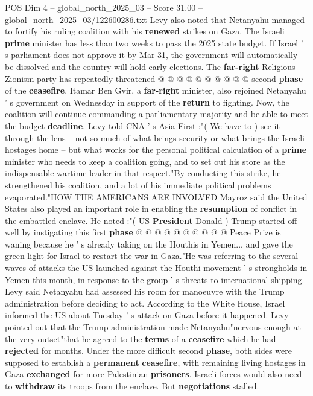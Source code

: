 \begin{textsample}{POS Dim 4 – global\_north\_2025\_03 – Score 31.00 – global\_north\_2025\_03/122600286.txt}
Levy also noted that Netanyahu managed to fortify his ruling coalition with his \textbf{renewed} strikes on Gaza.
The Israeli \textbf{prime} minister has less than two weeks to pass the 2025 state budget.
If Israel ' s parliament does not approve it by Mar 31, the government will automatically be dissolved and the country will hold early elections.
The \textbf{far-right} Religious Zionism party has repeatedly threatened @ @ @ @ @ @ @ @ @ @ second \textbf{phase} of the \textbf{ceasefire}.
Itamar Ben Gvir, a \textbf{far-right} minister, also rejoined Netanyahu ' s government on Wednesday in support of the \textbf{return} to fighting.
Now, the coalition will continue commanding a parliamentary majority and be able to meet the budget \textbf{deadline}.
Levy told CNA ' s Asia First :"( We have to ) see it through the lens -- not so much of what brings security or what brings the Israeli hostages home -- but what works for the personal political calculation of a \textbf{prime} minister who needs to keep a coalition going, and to set out his store as the indispensable wartime leader in that respect."By conducting this strike, he strengthened his coalition, and a lot of his immediate political problems evaporated."HOW THE AMERICANS ARE INVOLVED Mayroz said the United States also played an important role in enabling the \textbf{resumption} of conflict in the embattled enclave.
He noted :"( US \textbf{President} Donald ) Trump started off well by instigating this first \textbf{phase} @ @ @ @ @ @ @ @ @ @ Peace Prize is waning because he ' s already taking on the Houthis in Yemen... and gave the green light for Israel to restart the war in Gaza."He was referring to the several waves of attacks the US launched against the Houthi movement ' s strongholds in Yemen this month, in response to the group ' s threats to international shipping.
Levy said Netanyahu had assessed his room for manoeuvre with the Trump administration before deciding to act.
According to the White House, Israel informed the US about Tuesday ' s attack on Gaza before it happened.
Levy pointed out that the Trump administration made Netanyahu"nervous enough at the very outset"that he agreed to the \textbf{terms} of a \textbf{ceasefire} which he had \textbf{rejected} for months.
Under the more difficult second \textbf{phase}, both sides were supposed to establish a \textbf{permanent} \textbf{ceasefire}, with remaining living hostages in Gaza \textbf{exchanged} for more Palestinian \textbf{prisoners}.
Israeli forces would also need to \textbf{withdraw} its troops from the enclave.
But \textbf{negotiations} stalled.

\end{textsample}
